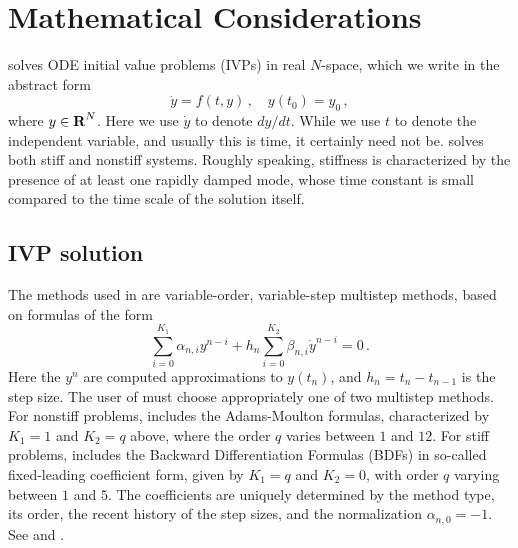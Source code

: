 \chapter{Mathematical Considerations}\label{s:math}

{\cvode} solves ODE initial value problems (IVPs) in real $N$-space, which we
write in the abstract form
\begin{equation}\label{e:ivp} 
  \dot{y} = f(t,y) \, ,\quad y(t_0) = y_0 \, ,
\end{equation}
where $y \in \mbox{\bf R}^N$.
Here we use $\dot{y}$ to denote $dy/dt$.  While we use $t$ to denote
the independent variable, and usually this is time, it certainly need
not be.  {\cvode} solves both stiff and nonstiff systems.  Roughly
speaking, stiffness is characterized by the presence of at least one
rapidly damped mode, whose time constant is small compared to the time
scale of the solution itself.

\section{IVP solution}\label{ss:ivp_sol}

The methods used in {\cvode} are variable-order, variable-step multistep
methods, based on formulas of the form
\begin{equation}\label{e:lmm}
 \sum_{i = 0}^{K_1} \alpha_{n,i} y^{n-i} + 
     h_n \sum_{i = 0}^{K_2} \beta_{n,i} {\dot{y}}^{n-i} = 0 \, .
\end{equation}
Here the $y^n$ are computed approximations to $y(t_n)$, and
$h_n = t_n - t_{n-1}$ is the step size.  The user of {\cvode} must choose
appropriately one of two multistep methods.  For nonstiff problems,
{\cvode} includes the Adams-Moulton formulas,
characterized by $K_1 = 1$
and $K_2 = q$ above, where the order $q$ varies between $1$ and $12$.
For stiff problems, {\cvode} includes the Backward Differentiation
Formulas (BDFs)   
in so-called fixed-leading coefficient form, given by
$K_1 = q$ and $K_2 = 0$, with order $q$ varying between $1$ and $5$.
The coefficients are uniquely determined by the method type, its
order, the recent history of the step sizes, and the normalization
$\alpha_{n,0} = -1$.  See \cite{ByHi:75} and \cite{JaSD:80}.

